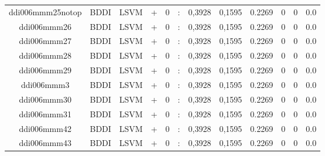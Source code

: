 \documentclass[a4paper]{article}
\begin{document}
\begin{landscape}
\begin{center}
\begin{tabular}{ |c|c|c|c|c|c|c|c|c|c|c|c|}
 	
 
 	
 		
 		\small{ ddi006mmm25notop } & BDDI & LSVM & +  &  0 &  :  &  0,3928 & 0,1595 & 0.2269  &  0 & 0 & 0.0 \\
 		

 	
 
 	
 		
 		\small{ ddi006mmm26 } & BDDI & LSVM & +  &  0 &  :  &  0,3928 & 0,1595 & 0.2269  &  0 & 0 & 0.0 \\
 		

 	
 
 	
 		
 		\small{ ddi006mmm27 } & BDDI & LSVM & +  &  0 &  :  &  0,3928 & 0,1595 & 0.2269  &  0 & 0 & 0.0 \\
 		

 	
 
 	
 		
 		\small{ ddi006mmm28 } & BDDI & LSVM & +  &  0 &  :  &  0,3928 & 0,1595 & 0.2269  &  0 & 0 & 0.0 \\
 		

 	
 
 	
 		
 		\small{ ddi006mmm29 } & BDDI & LSVM & +  &  0 &  :  &  0,3928 & 0,1595 & 0.2269  &  0 & 0 & 0.0 \\
 		

 	
 
 	
 		
 		\small{ ddi006mmm3 } & BDDI & LSVM & +  &  0 &  :  &  0,3928 & 0,1595 & 0.2269  &  0 & 0 & 0.0 \\
 		

 	
 
 	
 		
 		\small{ ddi006mmm30 } & BDDI & LSVM & +  &  0 &  :  &  0,3928 & 0,1595 & 0.2269  &  0 & 0 & 0.0 \\
 		

 	
 
 	
 		
 		\small{ ddi006mmm31 } & BDDI & LSVM & +  &  0 &  :  &  0,3928 & 0,1595 & 0.2269  &  0 & 0 & 0.0 \\
 		

 	
 
 	
 		
 		\small{ ddi006mmm42 } & BDDI & LSVM & +  &  0 &  :  &  0,3928 & 0,1595 & 0.2269  &  0 & 0 & 0.0 \\
 		

 	
 
 	
 		
 		\small{ ddi006mmm43 } & BDDI & LSVM & +  &  0 &  :  &  0,3928 & 0,1595 & 0.2269  &  0 & 0 & 0.0 \\
 		


\end{tabular}
\end{center}
\end{landscape}
\end{document}
